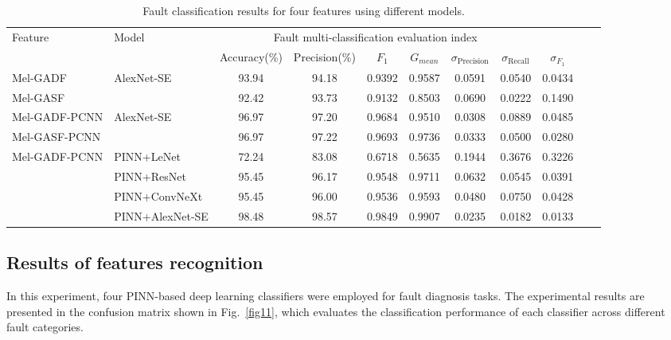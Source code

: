 \documentclass[final,5p,times,twocolumn]{elsarticle}
\begin{document}
\begin{table}[]
	\centering
	\label{tab4}
	\caption{Fault classification results for four features using different models.}
	\begin{tabular}{l l c c c c c c c c c}
		\toprule
		\multirow{2}{*}{Feature} & \multirow{2}{*}{Model} & \multicolumn{6}{c}{Fault multi-classification evaluation index}\\
		\cmidrule(lr){3-9}	
		&  & Accuracy(\%) & Precision(\%)  & $F_1$ & \(G_{mean}\) & \(\sigma_{\text{Precision}}\) & \(\sigma_{\text{Recall}}\) & \(\sigma_{F_1}\) \\
		\midrule
		\multirow{1}{*}{Mel-GADF} 
		
		& \multirow{2}{*}{AlexNet-SE} & 93.94 & 94.18 &  0.9392 & 0.9587 & 0.0591 & 0.0540 & 0.0434\\
		
		\multirow{1}{*}{Mel-GASF} 
		
		&  & 92.42  & 93.73 &  0.9132 & 0.8503 & 0.0690 &0.0222 & 0.1490 \\
		
		\midrule
		\multirow{1}{*}{Mel-GADF-PCNN} 
		
		&  \multirow{2}{*}{AlexNet-SE} & 96.97  & 97.20 &  0.9684 & 0.9510 & 0.0308 &0.0889 & 0.0485 \\
		
		\multirow{1}{*}{Mel-GASF-PCNN} 
		&   & 96.97  & 97.22 & 0.9693 & 0.9736 & 0.0333 &0.0500 & 0.0280 \\
		
		\midrule
		\multirow{4}{*}{Mel-GADF-PCNN} 
		& PINN+LeNet & 72.24 & 83.08 &  0.6718 & 0.5635 & 0.1944 & 0.3676 & 0.3226\\
		& PINN+ResNet & 95.45 & 96.17 &  0.9548 & 0.9711 & 0.0632 & 0.0545 & 0.0391 \\
		& PINN+ConvNeXt & 95.45 & 96.00 &  0.9536  & 0.9593 & 0.0480 & 0.0750 & 0.0428 \\
		& PINN+AlexNet-SE & 98.48  & 98.57  & 0.9849 & 0.9907 & 0.0235 &0.0182 & 0.0133 \\
		\midrule
	\end{tabular}
\end{table}

\subsection{Results of features recognition}
In this experiment, four PINN-based deep learning classifiers were employed for fault diagnosis tasks. The experimental results are presented in the confusion matrix shown in Fig.~\ref{fig11}, which evaluates the classification performance of each classifier across different fault categories.
\end{document}
